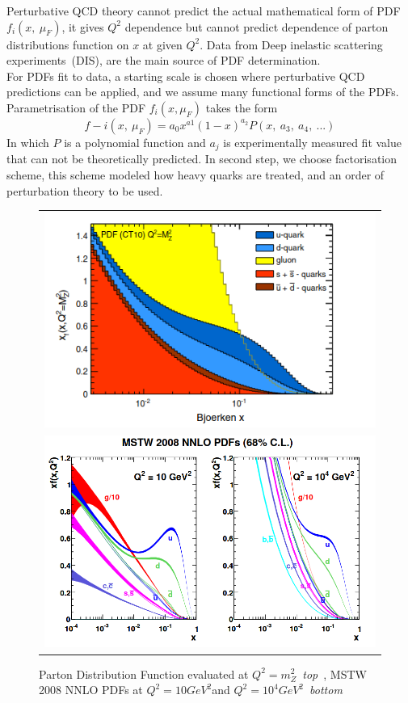 Perturbative QCD theory cannot predict the actual mathematical form of PDF $f_{i}(x,~\mu_{F})$, it gives $Q^{2}$ dependence but cannot predict dependence of parton distributions function on $x$ at given $Q^{2}$. Data from Deep inelastic scattering experiments~(DIS), are the main source of PDF determination. \\
For PDFs fit to data, a starting scale is chosen where perturbative QCD predictions can be applied, and we assume many functional forms of the PDFs.  Parametrisation of the PDF $f_{i}(x,\mu_{F})$ takes the form 
\begin{equation}
f-{i}(x,~\mu_{F})=a_{0}x^{a1}(1-x)^{a_{2}}P(x,~a_{3},~a_{4},~...)
\end{equation}   
In which $P$ is a polynomial function and $a_{j}$ is experimentally measured fit value that can not be theoretically predicted. In second step, we choose factorisation scheme, this scheme modeled how heavy quarks are treated, and an order of perturbation theory to be used. 
\begin{figure}[h!]
\centering
\begin{tabular}{c}
\includegraphics[scale=0.8]{chapter3/cteq-pdf.png}\\

\includegraphics[scale=0.5]{chapter3/pdf1.png}
\end{tabular}
\caption{Parton Distribution Function evaluated at $Q^{2}=m_{Z}^{2}$~\textit{top}~\cite{Schott_2014}, MSTW 2008 NNLO PDFs at $Q^{2} = 10 GeV^{2} $and $Q^{2} = 10^{4} GeV^{2}$~\textit{bottom}~\cite{Martin_2009}}
\label{pdf-fit}
\end{figure}

